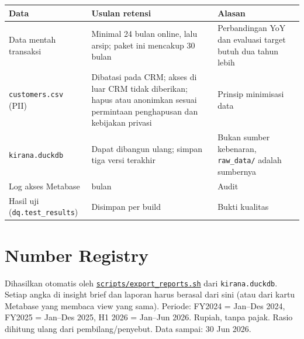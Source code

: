 \documentclass[10pt,a4paper]{article}
\begin{document}
{\def\LTcaptype{none} %
\begin{longtable}[]{@{}
  >{\raggedright\arraybackslash}p{}
  >{\raggedright\arraybackslash}p{}
  >{\raggedright\arraybackslash}p{}@{}}
\toprule\noalign{}
\begin{minipage}[b]{\linewidth}\raggedright
Data
\end{minipage} & \begin{minipage}[b]{\linewidth}\raggedright
Usulan retensi
\end{minipage} & \begin{minipage}[b]{\linewidth}\raggedright
Alasan
\end{minipage} \\
\midrule\noalign{}
\endhead
\bottomrule\noalign{}
\endlastfoot
Data mentah transaksi & Minimal 24 bulan online, lalu arsip; paket ini mencakup 30 bulan & Perbandingan YoY dan evaluasi target butuh dua tahun lebih \\
\texttt{customers.csv} (PII) & Dibatasi pada CRM; akses di luar CRM tidak diberikan; hapus atau anonimkan sesuai permintaan penghapusan dan kebijakan privasi & Prinsip minimisasi data \\
\texttt{kirana.duckdb} & Dapat dibangun ulang; simpan tiga versi terakhir & Bukan sumber kebenaran, \texttt{raw\_\allowbreak{}data/} adalah sumbernya \\
Log akses Metabase & 12 bulan & Audit \\
Hasil uji (\texttt{dq.test\_\allowbreak{}results}) & Disimpan per build & Bukti kualitas \\
\end{longtable}
}

\clearpage
\section{Number Registry}\label{number-registry}

Dihasilkan otomatis oleh \href{https://github.com/titan2903/kirana-omnichannel-performance-intelligence/blob/master/scripts/export_reports.sh}{\texttt{scripts/export\_\allowbreak{}reports.sh}} dari \texttt{kirana.duckdb}. Setiap angka di insight brief dan laporan harus berasal dari sini
(atau dari kartu Metabase yang membaca view yang sama). Periode: FY2024 = Jan--Des 2024, FY2025 = Jan--Des 2025, H1 2026 = Jan--Jun 2026.
Rupiah, tanpa pajak. Rasio dihitung ulang dari pembilang/penyebut. Data sampai: 30 Jun 2026.
\end{document}
